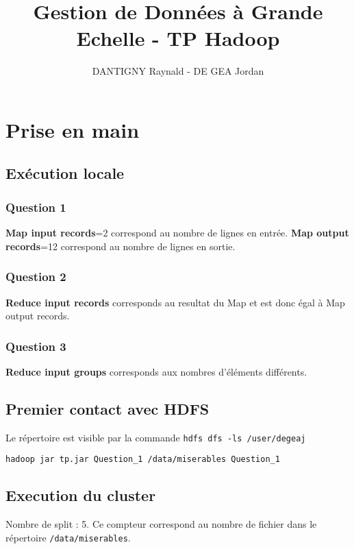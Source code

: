 \documentclass[a4paper,11pt]{article}
\author{DANTIGNY Raynald - DE GEA Jordan}
\title{Gestion de Données à Grande Echelle - TP Hadoop}
\begin{document}
\maketitle

\section{Prise en main}

\subsection{Exécution locale}

\subsubsection{Question 1}
\textbf{Map input records}=2 correspond au nombre de lignes en entrée. 
\textbf{Map output records}=12 correspond au nombre de lignes en sortie.

\subsubsection{Question 2}

\textbf{Reduce input records} corresponds au resultat du Map et est donc égal à Map output records. 

\subsubsection{Question 3}

\textbf{Reduce input groups} corresponds aux nombres d'éléments différents.

\subsection{Premier contact avec HDFS}

Le répertoire est visible par la commande \verb$hdfs dfs -ls /user/degeaj$

\verb$hadoop jar tp.jar Question_1 /data/miserables Question_1$

\subsection{Execution du cluster}

Nombre de split : 5.
Ce compteur correspond au nombre de fichier dans le répertoire \verb$/data/miserables$. 
\end{document}
